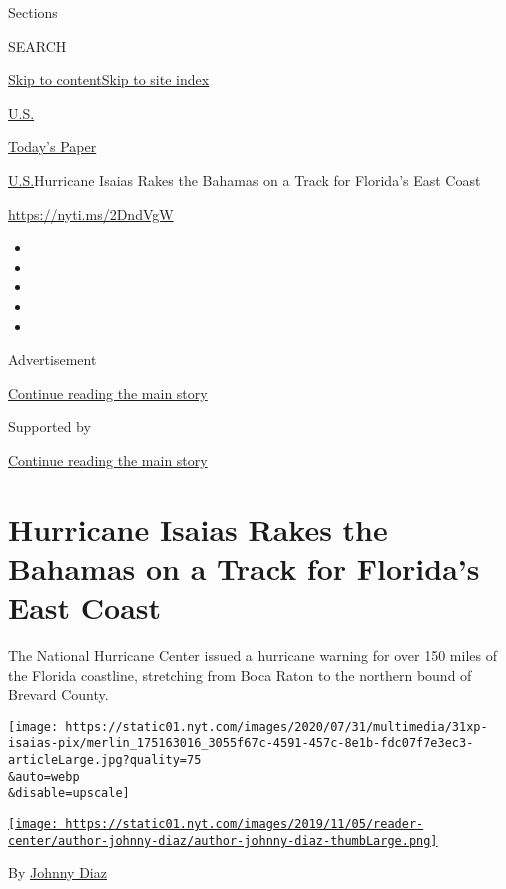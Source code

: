 Sections

SEARCH

\protect\hyperlink{site-content}{Skip to
content}\protect\hyperlink{site-index}{Skip to site index}

\href{https://www.nytimes.com/section/us}{U.S.}

\href{https://myaccount.nytimes.com/auth/login?response_type=cookie\&client_id=vi}{}

\href{https://www.nytimes.com/section/todayspaper}{Today's Paper}

\href{/section/us}{U.S.}\textbar{}Hurricane Isaias Rakes the Bahamas on
a Track for Florida's East Coast

\url{https://nyti.ms/2DndVgW}

\begin{itemize}
\item
\item
\item
\item
\item
\end{itemize}

Advertisement

\protect\hyperlink{after-top}{Continue reading the main story}

Supported by

\protect\hyperlink{after-sponsor}{Continue reading the main story}

\hypertarget{hurricane-isaias-rakes-the-bahamas-on-a-track-for-floridas-east-coast}{%
\section{Hurricane Isaias Rakes the Bahamas on a Track for Florida's
East
Coast}\label{hurricane-isaias-rakes-the-bahamas-on-a-track-for-floridas-east-coast}}

The National Hurricane Center issued a hurricane warning for over 150
miles of the Florida coastline, stretching from Boca Raton to the
northern bound of Brevard County.

\texttt{[image: https://static01.nyt.com/images/2020/07/31/multimedia/31xp-isaias-pix/merlin\_175163016\_3055f67c-4591-457c-8e1b-fdc07f7e3ec3-articleLarge.jpg?quality=75\\\&auto=webp\\\&disable=upscale]}

\href{https://www.nytimes.com/by/johnny-diaz}{\texttt{[image: https://static01.nyt.com/images/2019/11/05/reader-center/author-johnny-diaz/author-johnny-diaz-thumbLarge.png]}}

By \href{https://www.nytimes.com/by/johnny-diaz}{Johnny Diaz}

